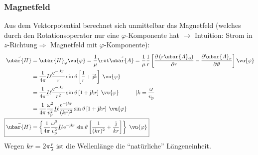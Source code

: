 		   \subsubsection{Magnetfeld}
			         Aus dem Vektorpotential berechnet sich unmittelbar das Magnetfeld (welches durch den Rotationsoperator nur eine $\varphi$-Komponente hat $\to$ Intuition: Strom in $z$-Richtung$\Rightarrow$ Magnetfeld mit $\varphi$-Komponente):
				              \begin{equation}\label{diphfeld}\begin{split}
						              \vec{\ubar{H}} &= \ubar{H}_\varphi \vu{\varphi} = \frac{1}{\mu} \rot  \vec{\ubar{A}} = \frac{1}{\mu} \frac{1}{r} \left[ \frac{\partial \left(r  \ubar{A}_\vartheta  \right)}{\partial r} - \frac{\partial  \ubar{A}_r}{\partial \vartheta} \right] \vu{\varphi} \\
						              &= \frac{1}{4\pi} \underline{I} \ell  \frac{ \mathrm{e}^{-\mathrm{j} kr}}{r}\sin\vartheta \left[\frac{1}{r} + \mathrm{j} k\right]\; \vu{\varphi}\\
						              &= \frac{1}{4\pi} \underline{I} \ell  \frac{ \mathrm{e}^{-\mathrm{j} kr}}{r^2} \sin\vartheta \left[1+\mathrm{j} k r \right]\; \vu{\varphi} \quad\quad\quad  |k = \frac{\omega}{ v_\mathrm{p}}\\
						              &= \frac{1}{4\pi} \frac{\omega^2}{ v_\mathrm{p}^2}\underline{I} \ell  \frac{ \mathrm{e}^{-\mathrm{j} kr}}{( kr)^2} \sin\vartheta \left[1+\mathrm{j} k r \right]\; \vu{\varphi} \\
						              \Aboxed{\vec{\ubar{H}}& = \left\{\frac{1}{4\pi} \frac{\omega^2}{ v_\mathrm{p}^2}\underline{I} \ell   \mathrm{e}^{-\mathrm{j} kr} \sin\vartheta \left[\frac{1}{( kr)^2}+ \frac{\mathrm{j}}{ k r} \right]\right\}\; \vu{\varphi}}
					              \end{split}\end{equation}
				        Wegen \( k r = 2\pi\frac{r}{\lambda}\) ist die Wellenlänge die \enquote{natürliche} Längeneinheit.
